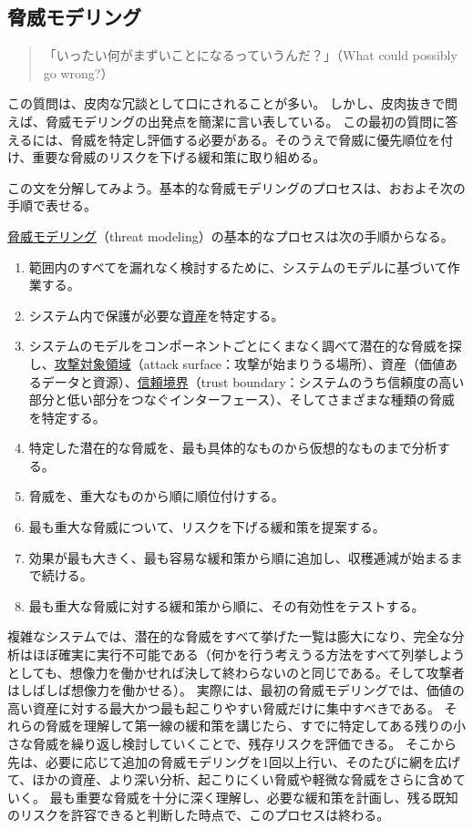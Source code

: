 \documentclass[uplatex]{jsarticle}
\def\label#1{}%
\begin{document}
\subsection{脅威モデリング}\label{subsec:ch2-threat-modeling}

\begin{quote}
「いったい何がまずいことになるっていうんだ？」（What could possibly go wrong?）
\end{quote}

この質問は、皮肉な冗談として口にされることが多い。
しかし、皮肉抜きで問えば、脅威モデリングの出発点を簡潔に言い表している。
この最初の質問に答えるには、脅威を特定し評価する必要がある。そのうえで脅威に優先順位を付け、重要な脅威のリスクを下げる緩和策に取り組める。

この文を分解してみよう。基本的な脅威モデリングのプロセスは、おおよそ次の手順で表せる。

\begin{dfn}[脅威モデリングの基本プロセス]\label{dfn:ch2-threat-modeling-process}
\underline{脅威モデリング}（threat modeling）の基本的なプロセスは次の手順からなる。
\begin{enumerate}
\item 範囲内のすべてを漏れなく検討するために、システムのモデルに基づいて作業する。
\item システム内で保護が必要な\underline{資産}を特定する。
\item システムのモデルをコンポーネントごとにくまなく調べて潜在的な脅威を探し、\underline{攻撃対象領域}（attack surface：攻撃が始まりうる場所）、資産（価値あるデータと資源）、\underline{信頼境界}（trust boundary：システムのうち信頼度の高い部分と低い部分をつなぐインターフェース）、そしてさまざまな種類の脅威を特定する。
\item 特定した潜在的な脅威を、最も具体的なものから仮想的なものまで分析する。
\item 脅威を、重大なものから順に順位付けする。
\item 最も重大な脅威について、リスクを下げる緩和策を提案する。
\item 効果が最も大きく、最も容易な緩和策から順に追加し、収穫逓減が始まるまで続ける。
\item 最も重大な脅威に対する緩和策から順に、その有効性をテストする。
\end{enumerate}
\end{dfn}

複雑なシステムでは、潜在的な脅威をすべて挙げた一覧は膨大になり、完全な分析はほぼ確実に実行不可能である（何かを行う考えうる方法をすべて列挙しようとしても、想像力を働かせれば決して終わらないのと同じである。そして攻撃者はしばしば想像力を働かせる）。
実際には、最初の脅威モデリングでは、価値の高い資産に対する最大かつ最も起こりやすい脅威だけに集中すべきである。
それらの脅威を理解して第一線の緩和策を講じたら、すでに特定してある残りの小さな脅威を繰り返し検討していくことで、残存リスクを評価できる。
そこから先は、必要に応じて追加の脅威モデリングを1回以上行い、そのたびに網を広げて、ほかの資産、より深い分析、起こりにくい脅威や軽微な脅威をさらに含めていく。
最も重要な脅威を十分に深く理解し、必要な緩和策を計画し、残る既知のリスクを許容できると判断した時点で、このプロセスは終わる。
\end{document}
